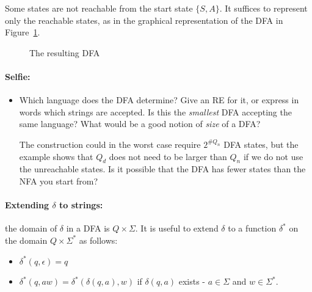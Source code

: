 Some states are not reachable from the start state $\{S,A\}$. It
suffices to represent only the reachable states, as in the graphical
representation of the DFA in Figure~\ref{fsa3}.

\clearpage
\begin{figure}[h]
\caption{The resulting DFA \label{fsa3}}
\end{figure}

\paragraph{Selfie:}
\begin{itemize}
\item[]
Which language does the DFA determine? Give an RE for it, or express
in words which strings are accepted. Is this the {\em smallest} DFA
accepting the same language? What would be a good notion of {\em size}
of a DFA?

The construction could in the worst case require $2^{\#Q_n}$ DFA
states, but the example shows that $Q_d$ does not need to be larger
than $Q_n$ if we do not use the unreachable states. Is it possible
that the DFA has fewer states than the NFA you start from?
\end{itemize}



\paragraph{Extending $\delta$ to strings:} the domain of $\delta$ in a
DFA is $Q \times \Sigma$. It is useful to extend $\delta$ to a
function $\delta^*$ on the domain $Q \times \Sigma^*$ as follows:

\begin{itemize}
\item $\delta^*(q,\epsilon) = q$
\item $\delta^*(q,aw) = \delta^*(\delta(q,a),w)$ if $\delta(q,a)$
exists - $a \in \Sigma$ and $w \in \Sigma^*$.
\end{itemize}

